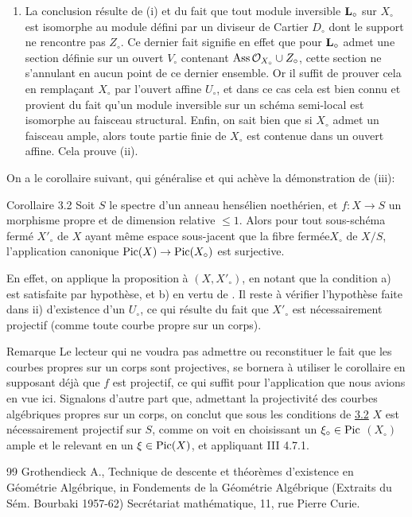 \documentclass[10pt]{../fichiers-configuration-latex/smfart}
\begin{document}
\begin{enumerate}
\item La conclusion résulte de (i) et du fait que tout module
inversible $\mathbf{L}_{\circ}$ sur $X_{\circ}$ est isomorphe au module
défini par un diviseur de Cartier $D_{\circ}$ dont le support ne
rencontre pas $Z_{\circ}$. Ce dernier fait signifie en effet que pour
$\mathbf{L}_{\circ}$ admet une section définie sur un ouvert $V_{\circ}$
contenant $\operatorname{Ass} {\mathcal O}_{X_{\circ}}\cup Z_{\circ}$, cette section ne
s'annulant en aucun point de ce dernier ensemble. Or il suffit de
prouver cela en remplaçant $X_{\circ}$ par l'ouvert affine
$U_{\circ}$, et dans ce cas cela est bien connu et provient du fait
qu'un module inversible sur un schéma semi-local est isomorphe au
faisceau structural. Enfin, on sait bien que si $X_{\circ}$ admet un
faisceau ample, alors toute partie finie de $X_{\circ}$ est contenue
dans un ouvert affine. Cela prouve (ii).
\end{enumerate}

On a le corollaire suivant, qui généralise  et qui achève la
démonstration de  (iii):

\begin{enonce*}{Corollaire 3.2}
Soit $S$ le spectre d'un anneau hensélien noethérien, et
$f:X\rightarrow S$ un morphisme propre et de dimension relative $\leq
1$. Alors pour tout sous-schéma fermé $X'_{\circ}$ de $X$ ayant même
espace sous-jacent que la fibre fermée\pageoriginale $X_{\circ}$ de
$X/S$, l'application canonique $\operatorname{Pic}(X)\rightarrow \operatorname{Pic}(X_{\circ})$
est surjective.
\end{enonce*}

En effet, on applique la proposition à $(X,X'_{\circ})$, en notant que
la condition a) est satisfaite par hypothèse, et b) en vertu de 
. Il reste à vérifier l'hypothèse faite dans ii)
d'existence d'un 
$U_{\circ}$, ce qui résulte du fait que $X'_{\circ}$ est
nécessairement projectif (comme toute courbe propre sur un corps).

\begin{enonce*}[remark]{Remarque}
Le lecteur qui ne voudra pas admettre ou reconstituer le fait que les
courbes propres sur un corps sont projectives, se bornera à utiliser
le corollaire en supposant déjà que $f$ est projectif, ce qui suffit
pour l'application que nous avions en vue ici. Signalons d'autre part
que, admettant la projectivité des courbes algébriques propres sur un
corps, on conclut que sous les conditions de \hyperref[XIII.cor3.2]{3.2} $X$ est
nécessairement projectif sur $S$, comme on voit en choisissant un
$\xi_{\circ}\in \operatorname{Pic}$ $(X_{\circ})$ ample et le relevant en un $\xi\in
\operatorname{Pic}(X)$, et appliquant \EGA III 4.7.1.
\end{enonce*}

\begin{thebibliography}{99}
 Grothendieck A., Technique de descente et
théorèmes d'existence en Géométrie Algébrique, in Fondements de la
Géométrie Algébrique (Extraits du Sém. Bourbaki 1957-62) Secrétariat
mathématique, 11, rue Pierre Curie.
\end{thebibliography}

\ifx\danslelivre\undefined
\end{document}
